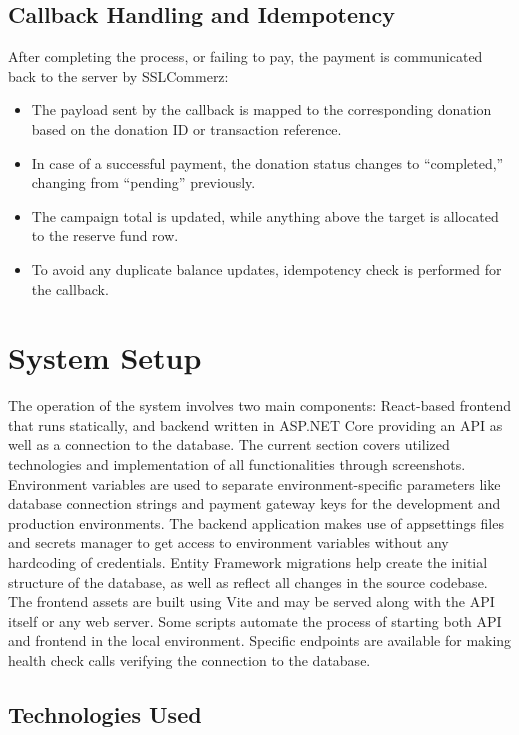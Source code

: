 \documentclass{thesis-library}
\begin{document}
\subsection{Callback Handling and Idempotency}
After completing the process, or failing to pay, the payment is communicated back to the server by SSLCommerz:
\begin{itemize}
    \item The payload sent by the callback is mapped to the corresponding donation based on the donation ID or transaction reference.
    \item In case of a successful payment, the donation status changes to ``completed,'' changing from ``pending'' previously.
    \item The campaign total is updated, while anything above the target is allocated to the reserve fund row.
    \item To avoid any duplicate balance updates, idempotency check is performed for the callback.
\end{itemize}


\section{System Setup}
The operation of the system involves two main components: React-based frontend that runs statically, and backend written in ASP.NET Core providing an API as well as a connection to the database. The current section covers utilized technologies and implementation of all functionalities through screenshots.
Environment variables are used to separate environment-specific parameters like database connection strings and payment gateway keys for the development and production environments.
The backend application makes use of appsettings files and secrets manager to get access to environment variables without any hardcoding of credentials.
Entity Framework migrations help create the initial structure of the database, as well as reflect all changes in the source codebase.
The frontend assets are built using Vite and may be served along with the API itself or any web server.
Some scripts automate the process of starting both API and frontend in the local environment.
Specific endpoints are available for making health check calls verifying the connection to the database.

\subsection{Technologies Used}
\end{document}
